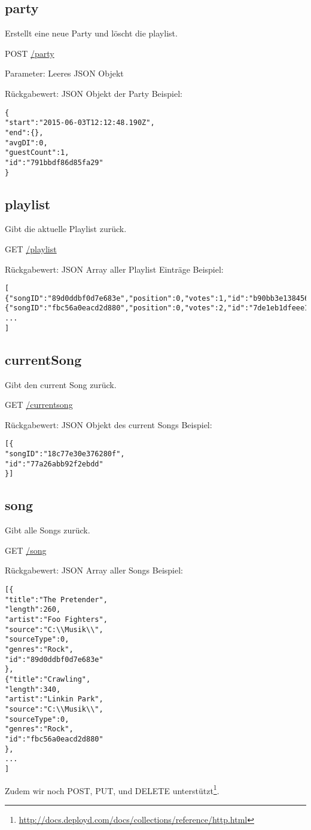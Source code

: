 \subsection{party}
\label{service:party}
Erstellt eine neue Party und löscht die playlist.

POST
\url{/party}

Parameter: Leeres JSON Objekt

Rückgabewert: JSON Objekt der Party
Beispiel:
\begin{lstlisting}
{
"start":"2015-06-03T12:12:48.190Z",
"end":{},
"avgDI":0,
"guestCount":1,
"id":"791bbdf86d85fa29"
}
\end{lstlisting}

\subsection{playlist}
\label{service:playlist}
Gibt die aktuelle Playlist zurück.

GET
\url{/playlist}

Rückgabewert: JSON Array aller Playlist Einträge
Beispiel:
\begin{lstlisting}
[
{"songID":"89d0ddbf0d7e683e","position":0,"votes":1,"id":"b90bb3e138456920"},
{"songID":"fbc56a0eacd2d880","position":0,"votes":2,"id":"7de1eb1dfeee188e"},
...
]
\end{lstlisting}


\subsection{currentSong}
\label{service:currentSong}
Gibt den current Song zurück.

GET
\url{/currentsong}

Rückgabewert: JSON Objekt des current Songs
Beispiel:
\begin{lstlisting}
[{
"songID":"18c77e30e376280f",
"id":"77a26abb92f2ebdd"
}]
\end{lstlisting}

\subsection{song}
\label{service:song}
Gibt alle Songs zurück.

GET
\url{/song}

Rückgabewert: JSON Array aller Songs
Beispiel:
\begin{lstlisting}
[{
"title":"The Pretender",
"length":260,
"artist":"Foo Fighters",
"source":"C:\\Musik\\",
"sourceType":0,
"genres":"Rock",
"id":"89d0ddbf0d7e683e"
},
{"title":"Crawling",
"length":340,
"artist":"Linkin Park",
"source":"C:\\Musik\\",
"sourceType":0,
"genres":"Rock",
"id":"fbc56a0eacd2d880"
},
...
]
\end{lstlisting}



Zudem wir noch POST, PUT, und DELETE unterstützt\footnote{\url{http://docs.deployd.com/docs/collections/reference/http.html}}.


